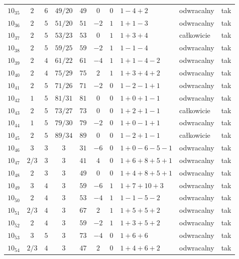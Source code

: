 \begin{longtable}{lccccccllc}
$10_{35}$  & $2$   & $6$ & $49/20$ & $49$  & $0$  & $0$ & $1-4+2$       & odwracalny & tak \\
$10_{36}$  & $2$   & $5$ & $51/20$ & $51$  & $-2$ & $1$ & $1+1-3$       & odwracalny & tak \\
$10_{37}$  & $2$   & $5$ & $53/23$ & $53$  & $0$  & $1$ & $1+3+4$       & całkowicie & tak \\
$10_{38}$  & $2$   & $5$ & $59/25$ & $59$  & $-2$ & $1$ & $1-1-4$       & odwracalny & tak \\
$10_{39}$  & $2$   & $4$ & $61/22$ & $61$  & $-4$ & $1$ & $1+1-4-2$     & odwracalny & tak \\
$10_{40}$  & $2$   & $4$ & $75/29$ & $75$  & $2$  & $1$ & $1+3+4+2$     & odwracalny & tak \\
$10_{41}$  & $2$   & $5$ & $71/26$ & $71$  & $-2$ & $0$ & $1-2-1+1$     & odwracalny & tak \\
$10_{42}$  & $1$   & $5$ & $81/31$ & $81$  & $0$  & $0$ & $1+0+1-1$     & odwracalny & tak \\
$10_{43}$  & $2$   & $5$ & $73/27$ & $73$  & $0$  & $0$ & $1+2+1-1$     & całkowicie & tak \\
$10_{44}$  & $1$   & $5$ & $79/30$ & $79$  & $-2$ & $0$ & $1+0-1+1$     & odwracalny & tak \\
$10_{45}$  & $2$   & $5$ & $89/34$ & $89$  & $0$  & $0$ & $1-2+1-1$     & całkowicie & tak \\
$10_{46}$  & $3$   & $3$ & $3$ & $31$  & $-6$ & $0$ & $1+0-6-5-1$   & odwracalny & tak \\
$10_{47}$  & $2/3$ & $3$ & $3$ & $41$  & $4$  & $0$ & $1+6+8+5+1$   & odwracalny & tak \\
$10_{48}$  & $2$   & $3$ & $3$ & $49$  & $0$  & $0$ & $1+4+8+5+1$   & odwracalny & tak \\
$10_{49}$  & $3$   & $4$ & $3$ & $59$  & $-6$ & $1$ & $1+7+10+3$    & odwracalny & tak \\
$10_{50}$  & $2$   & $4$ & $3$ & $53$  & $-4$ & $1$ & $1-1-5-2$     & odwracalny & tak \\
$10_{51}$  & $2/3$ & $4$ & $3$ & $67$  & $2$  & $1$ & $1+5+5+2$     & odwracalny & tak \\
$10_{52}$  & $2$   & $4$ & $3$ & $59$  & $-2$ & $1$ & $1+3+5+2$     & odwracalny & tak \\
$10_{53}$  & $3$   & $5$ & $3$ & $73$  & $-4$ & $0$ & $1+6+6$       & odwracalny & tak \\
$10_{54}$  & $2/3$ & $4$ & $3$ & $47$  & $2$  & $0$ & $1+4+6+2$     & odwracalny & tak \\

\end{longtable}
